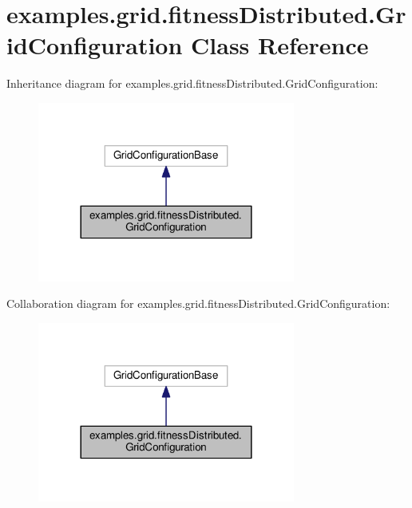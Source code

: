 \hypertarget{classexamples_1_1grid_1_1fitness_distributed_1_1_grid_configuration}{\section{examples.\-grid.\-fitness\-Distributed.\-Grid\-Configuration Class Reference}
\label{classexamples_1_1grid_1_1fitness_distributed_1_1_grid_configuration}
}


Inheritance diagram for examples.\-grid.\-fitness\-Distributed.\-Grid\-Configuration\-:
\nopagebreak
\begin{figure}[H]
\begin{center}
\leavevmode
\includegraphics[width=240pt]{classexamples_1_1grid_1_1fitness_distributed_1_1_grid_configuration__inherit__graph}
\end{center}
\end{figure}


Collaboration diagram for examples.\-grid.\-fitness\-Distributed.\-Grid\-Configuration\-:
\nopagebreak
\begin{figure}[H]
\begin{center}
\leavevmode
\includegraphics[width=240pt]{classexamples_1_1grid_1_1fitness_distributed_1_1_grid_configuration__coll__graph}
\end{center}
\end{figure}

